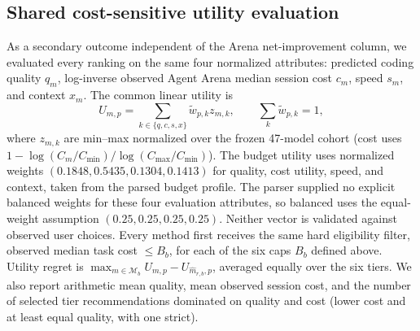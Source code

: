 \documentclass[pdflatex,sn-mathphys-num]{sn-jnl}
\theoremstyle{thmstyleone}
\theoremstyle{thmstylethree}
\begin{document}
\subsection{Shared cost-sensitive utility evaluation}\label{subsec:shared_utility}

As a secondary outcome independent of the Arena net-improvement column, we evaluated every ranking on the same four normalized attributes: predicted coding quality $q_m$, log-inverse observed Agent Arena median session cost $c_m$, speed $s_m$, and context $x_m$. The common linear utility is
\begin{equation}\label{eq:shared_utility}
U_{m,p}=\sum_{k\in\{q,c,s,x\}}\tilde w_{p,k}z_{m,k},\qquad \sum_k\tilde w_{p,k}=1,
\end{equation}
where $z_{m,k}$ are min--max normalized over the frozen 47-model cohort (cost uses $1-\log(C_m/C_{\min})/\log(C_{\max}/C_{\min})$). The budget utility uses normalized weights $(0.1848,0.5435,0.1304,0.1413)$ for quality, cost utility, speed, and context, taken from the parsed budget profile. The parser supplied no explicit balanced weights for these four evaluation attributes, so balanced uses the equal-weight assumption $(0.25,0.25,0.25,0.25)$. Neither vector is validated against observed user choices. Every method first receives the same hard eligibility filter, observed median task cost $\leq B_b$, for each of the six caps $B_b$ defined above. Utility regret is $\max_{m\in\mathcal M_b}U_{m,p}-U_{\hat m_{r,b},p}$, averaged equally over the six tiers. We also report arithmetic mean quality, mean observed session cost, and the number of selected tier recommendations dominated on quality and cost (lower cost and at least equal quality, with one strict).
\end{document}
